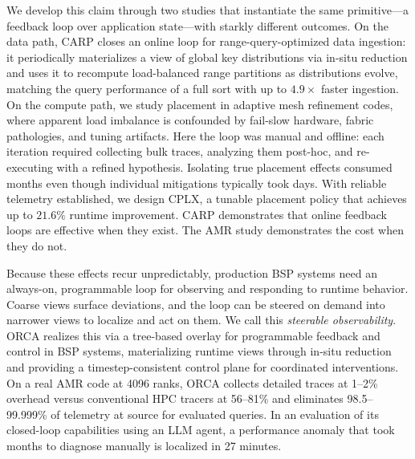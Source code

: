 We develop this claim through two studies that instantiate the same primitive---a feedback loop
over application state---with starkly different outcomes.
On the data path, CARP closes an online loop for range-query-optimized data ingestion: it
periodically materializes a view of global key distributions via in-situ reduction and uses it to
recompute load-balanced range partitions as distributions evolve, matching the query performance of
a full sort with up to $4.9\times$ faster ingestion.
On the compute path, we study placement in adaptive mesh refinement codes, where apparent load
imbalance is confounded by fail-slow hardware, fabric pathologies, and tuning artifacts.
Here the loop was manual and offline: each iteration required collecting bulk traces, analyzing
them post-hoc, and re-executing with a refined hypothesis.
Isolating true placement effects consumed months even though individual mitigations typically took
days.
With reliable telemetry established, we design CPLX, a tunable placement policy that achieves up
to $21.6\%$ runtime improvement.
CARP demonstrates that online feedback loops are effective when they exist.
The AMR study demonstrates the cost when they do not.


Because these effects recur unpredictably, production BSP systems need an always-on,
programmable loop for observing and responding to runtime behavior.
Coarse views surface deviations, and the loop can be steered on demand into narrower views to
localize and act on them.
We call this \emph{steerable observability}.
ORCA realizes this via a tree-based overlay for programmable feedback and control in BSP systems,
materializing runtime views through in-situ reduction and providing a timestep-consistent control
plane for coordinated interventions.
On a real AMR code at 4096 ranks, ORCA collects detailed traces at 1--2\% overhead versus
conventional HPC tracers at 56--81\% and eliminates 98.5--99.999\% of telemetry at source for
evaluated queries.
In an evaluation of its closed-loop capabilities using an LLM agent, a performance anomaly that
took months to diagnose manually is localized in 27 minutes.
